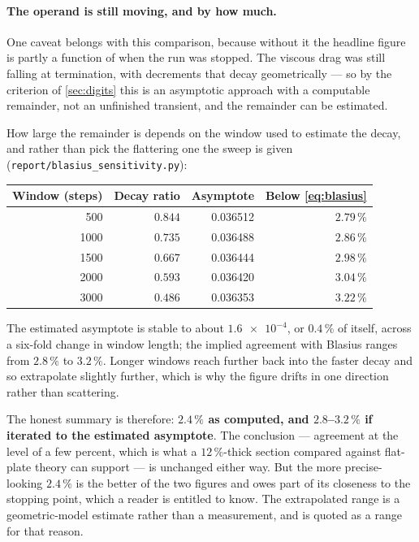 \paragraph{The operand is still moving, and by how much.} One caveat belongs with this
comparison, because without it the headline figure is partly a function of when the run
was stopped. The viscous drag was still falling at termination, with decrements that
decay geometrically --- so by the criterion of \cref{sec:digits} this is an asymptotic
approach with a computable remainder, not an unfinished transient, and the remainder can
be estimated.

How large the remainder is depends on the window used to estimate the decay, and rather
than pick the flattering one the sweep is given
(\texttt{report/blasius\_sensitivity.py}):

\begin{center}
\begin{tabular}{rrrr}
  \toprule
  Window (steps) & Decay ratio & Asymptote & Below \cref{eq:blasius} \\
  \midrule
  \num{500} & $0.844$ & \num{0.036512} & $2.79\,\%$ \\
  \num{1000} & $0.735$ & \num{0.036488} & $2.86\,\%$ \\
  \num{1500} & $0.667$ & \num{0.036444} & $2.98\,\%$ \\
  \num{2000} & $0.593$ & \num{0.036420} & $3.04\,\%$ \\
  \num{3000} & $0.486$ & \num{0.036353} & $3.22\,\%$ \\
  \bottomrule
\end{tabular}
\end{center}

\noindent The estimated asymptote is stable to about $\num{1.6e-4}$, or $0.4\,\%$ of
itself, across a six-fold change in window length; the implied agreement with Blasius
ranges from $2.8\,\%$ to $3.2\,\%$. Longer windows reach further back into the faster
decay and so extrapolate slightly further, which is why the figure drifts in one
direction rather than scattering.

The honest summary is therefore: \textbf{$2.4\,\%$ as computed, and $2.8$--$3.2\,\%$ if
iterated to the estimated asymptote}. The conclusion --- agreement at the level of a few
percent, which is what a $12\,\%$-thick section compared against flat-plate theory can
support --- is unchanged either way. But the more precise-looking $2.4\,\%$ is the better
of the two figures and owes part of its closeness to the stopping point, which a reader
is entitled to know. The extrapolated range is a geometric-model estimate rather than a
measurement, and is quoted as a range for that reason.

